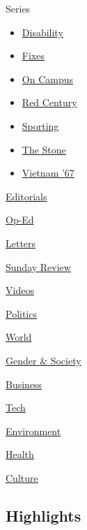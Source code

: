 Series

\begin{itemize}
\tightlist
\item
  \href{/column/disability}{Disability}
\item
  \href{/column/fixes}{Fixes}
\item
  \href{/column/on-campus}{On Campus}
\item
  \href{/column/red-century}{Red Century}
\item
  \href{/column/sporting}{Sporting}
\item
  \href{/column/the-stone}{The Stone}
\item
  \href{/column/vietnam-67}{Vietnam '67}
\end{itemize}

\href{/section/opinion/editorials}{Editorials}

\href{/section/opinion/contributors}{Op-Ed}

\href{/section/opinion/letters}{Letters}

\href{/section/opinion/sunday}{Sunday Review}

\href{/video/opinion}{Videos}

\href{/section/opinion/politics}{Politics}

\href{/section/opinion/international-world}{World}

\href{/section/opinion/gender-and-society}{Gender \& Society}

\href{/section/opinion/business-economics}{Business}

\href{/section/opinion/technology}{Tech}

\href{/section/opinion/environment}{Environment}

\href{/section/opinion/health}{Health}

\href{/section/opinion/culture}{Culture}

\hypertarget{highlights}{%
\subsection{Highlights}\label{highlights}}

